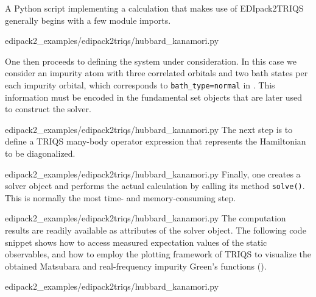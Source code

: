 \documentclass[edipack_sp.tex]{subfiles}
\begin{document}
A Python script implementing a calculation that makes use of EDIpack2TRIQS
generally begins with a few module imports.

{edipack2_examples/edipack2triqs/hubbard_kanamori.py}

One then proceeds to defining the system under consideration. In this case we
consider an impurity atom with three correlated orbitals and two bath states
per each impurity orbital, which corresponds to {\tt bath\_type=normal} in \NAME. This information must be encoded in the fundamental
set objects that are later used to construct the solver.

{edipack2_examples/edipack2triqs/hubbard_kanamori.py}
The next step is to define a TRIQS many-body operator expression that represents
the Hamiltonian to be diagonalized.

{edipack2_examples/edipack2triqs/hubbard_kanamori.py}
Finally, one creates a solver object and performs the actual calculation by
calling its method {\tt solve()}. This is normally the most time- and
memory-consuming step.

{edipack2_examples/edipack2triqs/hubbard_kanamori.py}
The computation results are readily available as attributes of the solver
object. The following code snippet shows how to access measured expectation
values of the static observables, and how to employ the plotting framework of
TRIQS to visualize the obtained Matsubara and real-frequency impurity Green's
functions ().

{edipack2_examples/edipack2triqs/hubbard_kanamori.py}
\end{document}
